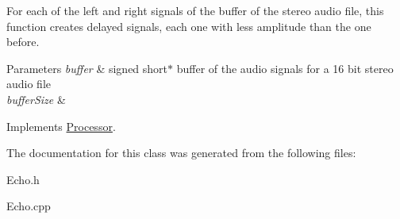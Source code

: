 For each of the left and right signals of the buffer of the stereo audio file, this function creates delayed signals, each one with less amplitude than the one before. 


\begin{DoxyParams}{Parameters}
{\em buffer} & signed short$\ast$ buffer of the audio signals for a 16 bit stereo audio file \\
\hline
{\em buffer\+Size} & \\
\hline
\end{DoxyParams}


Implements \hyperlink{classProcessor}{Processor}.



The documentation for this class was generated from the following files\+:\begin{DoxyCompactItemize}
\item 
Echo.\+h\item 
Echo.\+cpp\end{DoxyCompactItemize}
